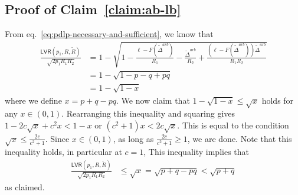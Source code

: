 \subsection{Proof of Claim~\ref{claim:ab-lb}}\label{app:ineq-proof}
From eq.~\eqref{eq:pdlp-necessary-and-sufficient}, we know that
\begin{align*}
\frac{\mathsf{LVR}(p_1, R, \tilde{R})}{\sqrt{2 p_1 R_1 R_2}} &= 1 - \sqrt{1 - \frac{\ell - F(\tilde{\Delta}^{arb})}{R_1} - \frac{\tilde{\Delta}^{arb}}{R_2} + \frac{(\ell - F(\tilde{\Delta}^{arb}))\tilde{\Delta}^{arb}}{R_1 R_2}} \\ 
& = 1 - \sqrt{1 - p - q + pq} \\
& = 1 - \sqrt{1 - x}
\end{align*}
where we define $x = p + q - pq$.
We now claim that $1-\sqrt{1-x} \leq \sqrt{x}$ holds for any $x \in (0, 1)$.
Rearranging this inequality and squaring gives $1 - 2c\sqrt{x} + c^2 x < 1 - x$ or $(c^2+1)x < 2 c \sqrt{x}$.
This is equal to the condition $\sqrt{x} \leq \frac{2c}{c^2 +1}$.
Since $x \in (0,1)$, as long as $\frac{2c}{c^2 + 1} \geq 1$, we are done.
Note that this inequality holds, in particular at $c = 1$,
This inequality implies that 
\begin{align*}
\frac{\mathsf{LVR}(p_1, R, \tilde{R})}{\sqrt{2 p_1 R_1 R_2}} &\leq \sqrt{x} = \sqrt{p+q - pq} < \sqrt{p+q}
\end{align*}
as claimed.

